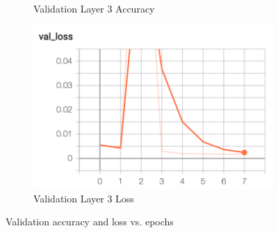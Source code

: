 \documentclass[11pt, letterpaper]{article}
\begin{document}
\begin{figure}[h]
\begin{subfigure}{0.4\textwidth}
        \caption{Validation Layer 3 Accuracy}
    \end{subfigure}
    \begin{subfigure}{0.4\textwidth}
        \includegraphics[width=0.8\linewidth]{val_layer_3_loss.png}
        \caption{Validation Layer 3 Loss}
    \end{subfigure}
    \caption{Validation accuracy and loss vs. epochs}
    \label{fig:hg_4_val}
\end{figure}
\end{document}
